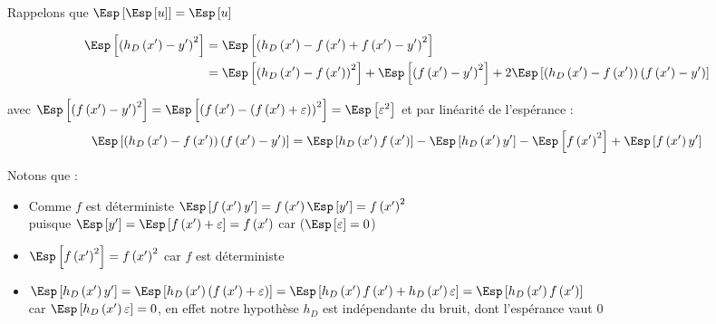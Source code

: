 \begin{reponse}

	Rappelons que $\Esp\left[\Esp\left[u\right]\right]= \Esp\left[u\right]$

	\begin{align*}
		\Esp\left[\left(h_D\left({x^{\prime}}\right) - y^{\prime}\right)^2\right]
		 & = \Esp\left[\left(h_D\left({x^{\prime}}\right) - f\left(x^{\prime}\right)+f\left(x^{\prime}\right)- y^{\prime}\right)^2\right]         \\
		 & = \Esp\left[\left(h_D\left({x^{\prime}}\right) - f\left(x^{\prime}\right)\right)^2\right]
		+ \Esp\left[\left(f\left(x^{\prime}\right)- y^{\prime}\right)^2\right]
		+ 2\Esp\left[\left(h_D\left({x^{\prime}}\right) - f\left(x^{\prime}\right)\right)\left(f\left(x^{\prime}\right)- y^{\prime}\right)\right] \\
	\end{align*}

	avec $\Esp\left[\left(f\left(x^{\prime}\right)- y^{\prime}\right)^2\right] = \Esp\left[\left(f\left(x^{\prime}\right) - \left(f\left(x^{\prime}\right) + \varepsilon\right)\right)^2\right] = \Esp\left[\varepsilon^2\right]$ et par linéarité de l'espérance :
	$$\Esp\left[\left(h_D\left({x^{\prime}}\right) - f\left(x^{\prime}\right)\right)\left(f\left(x^{\prime}\right)- y^{\prime}\right)\right] =
		\Esp\left[h_D\left({x^{\prime}}\right)f\left(x^{\prime}\right)\right]
		- \Esp\left[h_D\left({x^{\prime}}\right)y^{\prime}\right]
		- \Esp\left[f\left(x^{\prime}\right)^{2}\right]
		+ \Esp\left[f\left(x^{\prime}\right)y^{\prime}\right]$$

	Notons que :
	\begin{itemize}
		\item Comme $f$ est déterministe $\Esp\left[f\left(x^{\prime}\right)y^{\prime}\right] = f\left(x^{\prime}\right)\Esp\left[y^{\prime}\right] = f\left(x^{\prime}\right)^2$
		      \\puisque $\Esp\left[y^{\prime}\right] = \Esp\left[f\left(x^{\prime}\right) + \varepsilon\right]= f\left(x^{\prime}\right)$
		      car ($\Esp\left[\varepsilon\right]=0$)
		\item $\Esp\left[f\left(x^{\prime}\right)^{2}\right] = f\left(x^{\prime}\right)^{2}$ car $f$ est déterministe
		\item $\Esp\left[h_D\left({x^{\prime}}\right)y^{\prime}\right] = \Esp\left[h_D\left({x^{\prime}}\right)\left(f\left(x^{\prime}\right) + \varepsilon\right)\right] = \Esp\left[h_D\left({x^{\prime}}\right)f\left(x^{\prime}\right) + h_D\left({x^{\prime}}\right)\varepsilon\right] = \Esp\left[h_D\left({x^{\prime}}\right)f\left(x^{\prime}\right)\right]$ \\car $\Esp\left[h_D\left({x^{\prime}}\right)\varepsilon\right] = 0$, en effet notre hypothèse $h_D$ est indépendante du bruit, dont l'espérance vaut $0$
	\end{itemize}


\end{reponse}
